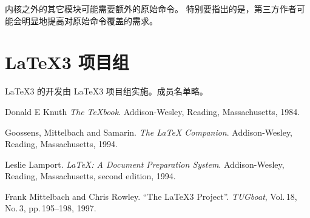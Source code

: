 \documentclass[full]{l3doc}
\begin{document}
%
 内核之外的其它模块可能需要额外的原始命令。
特别要指出的是，第三方作者可能会明显地提高对原始命令覆盖的需求。

%
\section{\LaTeX3 项目组}
\LaTeX3 的开发由 \LaTeX3 项目组实施。成员名单略。

%
%

\begin{thebibliography}{1}

 Donald E Knuth
 \newblock \emph{The \TeX{}book}.
 \newblock Addison-Wesley, Reading, Massachusetts, 1984.

 Goossens, Mittelbach and Samarin.
 \newblock \emph{ The \LaTeX{} Companion}.
 \newblock Addison-Wesley, Reading, Massachusetts, 1994.

 Leslie Lamport.
 \newblock \emph{\LaTeX{}: A Document Preparation System}.
 \newblock Addison-Wesley, Reading, Massachusetts, second edition, 1994.

 Frank Mittelbach and Chris Rowley.
 \newblock \enquote{The \LaTeX3 Project}.
 \newblock \emph{TUGboat},
 Vol.\,18, No.\,3, pp.\,195--198, 1997.

\end{thebibliography}
\end{document}
